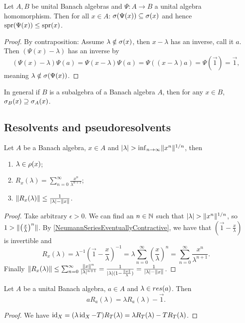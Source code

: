 \begin{lemma} \label{spectrumOfImage}
Let $A,B$ be unital Banach algebras and $\Psi: A\to B$ a unital algebra homomorphism. Then for all $x\in A$: $\sigma(\Psi(x)) \subseteq \sigma(x)$ and hence $\operatorname{spr}(\Psi(x)) \leq \operatorname{spr}(x)$.
\end{lemma}
\begin{proof}
By contraposition: Assume $\lambda\notin\sigma(x)$, then $x-\lambda$ has an inverse, call it $a$. Then $(\Psi(x) - \lambda)$ has an inverse by
\[ (\Psi(x) - \lambda)\Psi(a) = \Psi(x-\lambda)\Psi(a) = \Psi((x-\lambda)a) = \Psi(\vec{1}) = \vec{1},\]
meaning $\lambda \notin \sigma(\Psi(x))$.
\end{proof}

In general if $B$ is a subalgebra of a Banach algebra $A$, then for any $x\in B$, $\sigma_B(x) \supseteq \sigma_A(x)$.


\subsection{Resolvents and pseudoresolvents}

\begin{proposition} \label{secondNeumannSeries}
Let $A$ be a Banach algebra, $x\in A$ and $|\lambda| > \inf_{n\to \infty}\lVert x^n\rVert^{1/n}$, then
\begin{enumerate}
\item $\lambda\in\rho(x)$;
\item $R_x(\lambda) = \sum_{n=0}^\infty\frac{x^n}{\lambda^{n+1}}$;
\item $\lVert R_x(\lambda)\rVert \leq \frac{1}{|\lambda|-\lVert x\rVert}$.
\end{enumerate}
\end{proposition}
\begin{proof}
Take arbitrary $\epsilon > 0$. We can find an $n\in\mathbb{N}$ such that $|\lambda| > \lVert x^n\rVert^{1/n}$, so $1 > \lVert\left(\frac{x}{\lambda}\right)^n\rVert$. By \ref{NeumannSeriesEventuallyContractive}, we have that $(\vec{1} - \frac{x}{\lambda})$ is invertible and
\[ R_x(\lambda) = \lambda^{-1} \left(\vec{1} - \frac{x}{\lambda}\right)^{-1} = \lambda \sum_{n=0}^\infty\left(\frac{x}{\lambda}\right)^n = \sum_{n=0}^\infty\frac{x^n}{\lambda^{n+1}}. \]
Finally $\lVert R_x(\lambda)\rVert \leq \sum_{n=0}^\infty\frac{\lVert x\rVert^n}{|\lambda|^{n+1}} = \frac{1}{|\lambda|(1-\frac{\lVert x\rVert}{\lambda})} = \frac{1}{|\lambda|-\lVert x\rVert}$.
\end{proof}

\begin{lemma} \label{BanachAlgebraResolventMultiplication}
Let $A$ be a unital Banach algebra, $a\in A$ and $\lambda\in\\res(a)$. Then
\[ aR_a(\lambda) = \lambda R_a(\lambda) - \vec{1}. \]
\end{lemma}
\begin{proof}
We have $\operatorname{id}_X = (\lambda \operatorname{id}_X - T)R_T(\lambda) = \lambda R_T(\lambda) - TR_T(\lambda)$.
\end{proof}

